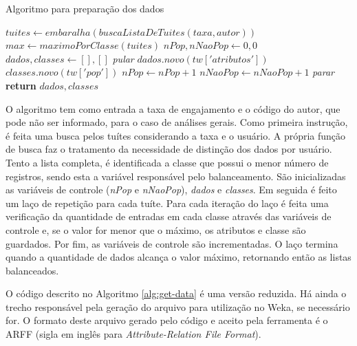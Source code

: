 \documentclass[oneside,openright,12pt]{ufsm_2015} %
\begin{document}
    \begin{algorithm}[ht]
    \caption{Algoritmo para preparação dos dados}
    \label{alg:get-data}
    \begin{algorithmic}[1]
        \State $tuites \gets embaralha(buscaListaDeTuites(taxa, autor))$
        \State 
        \State $max \gets maximoPorClasse(tuites)$
        \State $nPop, nNaoPop \gets 0, 0$
        \State $dados, classes \gets [ ], [ ]$
        \State
                \State \textit{pular}
            \EndIf
            \State 
            \State $dados.novo(tw['atributos'])$
            \State $classes.novo(tw['pop'])$
            \State
                \State $nPop \gets nPop + 1$
            \Else
                \State $nNaoPop \gets nNaoPop + 1$
            \EndIf
            \State
                \State \textit{parar}
            \EndIf
        \EndFor
        \State \textbf{return} $dados, classes$
        \EndFunction
    \end{algorithmic}
    \end{algorithm}
    
    \par O algoritmo tem como entrada a taxa de engajamento e o código do autor, que pode não ser informado, para o caso de análises gerais. Como primeira instrução, é feita uma busca pelos tuítes considerando a taxa e o usuário. A própria função de busca faz o tratamento da necessidade de distinção dos dados por usuário. Tento a lista completa, é identificada a classe que possui o menor número de registros, sendo esta a variável responsável pelo balanceamento. São inicializadas as variáveis de controle (\textit{nPop} e \textit{nNaoPop}), \textit{dados} e \textit{classes}. Em seguida é feito um laço de repetição para cada tuíte. Para cada iteração do laço é feita uma verificação da quantidade de entradas em cada classe através das variáveis de controle e, se o valor for menor que o máximo, os atributos e classe são guardados. Por fim, as variáveis de controle são incrementadas. O laço termina quando a quantidade de dados alcança o valor máximo, retornando então as listas balanceados.
    
    \par O código descrito no Algoritmo \ref{alg:get-data} é uma versão reduzida. Há ainda o trecho responsável pela geração do arquivo para utilização no Weka, se necessário for. O formato deste arquivo gerado pelo código e aceito pela ferramenta é o ARFF (sigla em inglês para \textit{Attribute-Relation File Format}).
\end{document}
